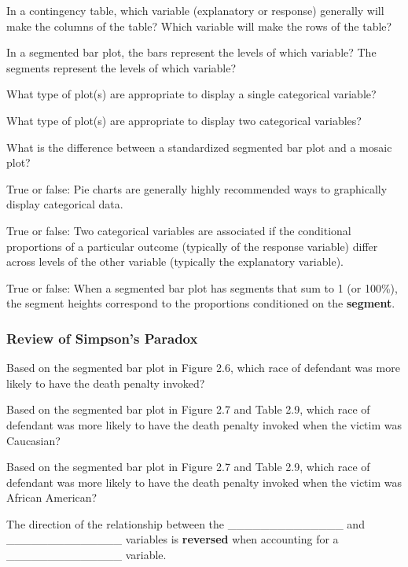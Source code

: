 \documentclass[
]{report}
\newcommand{\rgs}{\vspace{12pt}} %
\begin{document}
In a contingency table, which variable (explanatory or response) generally will make the columns of the table? Which variable will make the rows of the table?
\rgs

In a segmented bar plot, the bars represent the levels of which variable? The segments represent the levels of which variable?
\rgs

What type of plot(s) are appropriate to display a single categorical variable?
\rgs

What type of plot(s) are appropriate to display two categorical variables?
\rgs

What is the difference between a standardized segmented bar plot and a mosaic plot?
\rgs

True or false: Pie charts are generally highly recommended ways to graphically display categorical data.

True or false: Two categorical variables are associated if the conditional proportions of a particular outcome (typically of the response variable) differ across levels of the other variable (typically the explanatory variable).

True or false: When a segmented bar plot has segments that sum to 1 (or 100\%), the segment heights correspond to the proportions conditioned on the \textbf{segment}.

\hypertarget{review-of-simpsons-paradox}{%
\subsubsection*{Review of Simpson's Paradox}\label{review-of-simpsons-paradox}}

Based on the segmented bar plot in Figure 2.6, which race of defendant was more likely to have the death penalty invoked?
\rgs

Based on the segmented bar plot in Figure 2.7 and Table 2.9, which race of defendant was more likely to have the death penalty invoked when the victim was Caucasian?
\rgs

Based on the segmented bar plot in Figure 2.7 and Table 2.9, which race of defendant was more likely to have the death penalty invoked when the victim was African American?
\rgs

The direction of the relationship between the \_\_\_\_\_\_\_\_\_\_\_\_\_\_
and \_\_\_\_\_\_\_\_\_\_\_\_\_\_ variables is \textbf{reversed} when accounting for
a \_\_\_\_\_\_\_\_\_\_\_\_\_\_ variable.
\rgs
\end{document}
